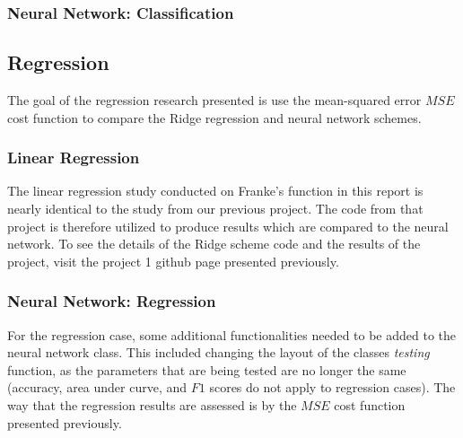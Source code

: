 			
                
        \subsubsection{Neural Network: Classification}
            
        
            
    \subsection{Regression}
        The goal of the regression research presented is use the mean-squared error $MSE$ cost function to compare the Ridge regression and neural network schemes. 
        \subsubsection{Linear Regression}
            The linear regression study conducted on Franke's function in this report is nearly identical to the study from our previous project. The code from that project is therefore utilized to produce results which are compared to the neural network. To see the details of the Ridge scheme code and the results of the project, visit the project 1 github page presented previously.
        \subsubsection{Neural Network: Regression}
            For the regression case, some additional functionalities needed to be added to the neural network class. This included changing the layout of the classes \textit{testing} function, as the parameters that are being tested are no longer the same (accuracy, area under curve, and $F1$ scores do not apply to regression cases). The way that the regression results are assessed is by the $MSE$ cost function presented previously. 